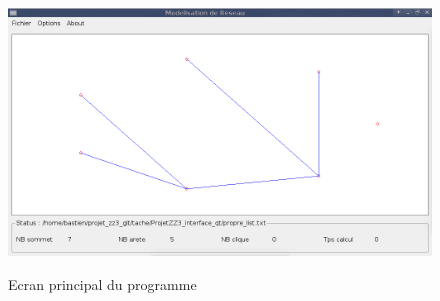 \begin{figure}[ht]
\centering
 \fbox
 {
 \includegraphics[width=16cm]{./schema/capture_ecran_graph.png}
 }
  \caption{\label{ecran_graph}Ecran principal du programme}
\end{figure}